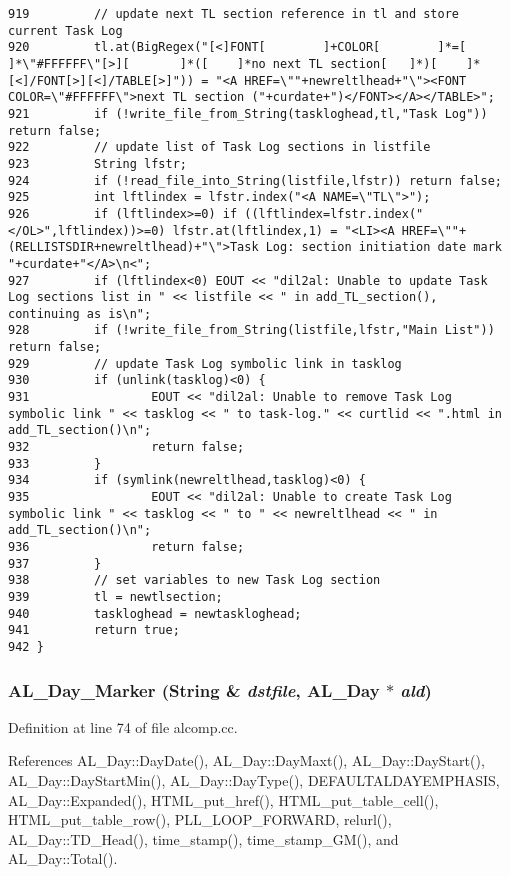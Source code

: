\begin{verbatim}
919         // update next TL section reference in tl and store current Task Log
920         tl.at(BigRegex("[<]FONT[        ]+COLOR[        ]*=[    ]*\"#FFFFFF\"[>][       ]*([    ]*no next TL section[   ]*)[    ]*[<]/FONT[>][<]/TABLE[>]")) = "<A HREF=\""+newreltlhead+"\"><FONT COLOR=\"#FFFFFF\">next TL section ("+curdate+")</FONT></A></TABLE>";
921         if (!write_file_from_String(taskloghead,tl,"Task Log")) return false;
922         // update list of Task Log sections in listfile
923         String lfstr;
924         if (!read_file_into_String(listfile,lfstr)) return false;
925         int lftlindex = lfstr.index("<A NAME=\"TL\">");
926         if (lftlindex>=0) if ((lftlindex=lfstr.index("</OL>",lftlindex))>=0) lfstr.at(lftlindex,1) = "<LI><A HREF=\""+(RELLISTSDIR+newreltlhead)+"\">Task Log: section initiation date mark "+curdate+"</A>\n<";
927         if (lftlindex<0) EOUT << "dil2al: Unable to update Task Log sections list in " << listfile << " in add_TL_section(), continuing as is\n";
928         if (!write_file_from_String(listfile,lfstr,"Main List")) return false;
929         // update Task Log symbolic link in tasklog
930         if (unlink(tasklog)<0) {
931                 EOUT << "dil2al: Unable to remove Task Log symbolic link " << tasklog << " to task-log." << curtlid << ".html in add_TL_section()\n";
932                 return false;
933         }
934         if (symlink(newreltlhead,tasklog)<0) {
935                 EOUT << "dil2al: Unable to create Task Log symbolic link " << tasklog << " to " << newreltlhead << " in add_TL_section()\n";
936                 return false;
937         }
938         // set variables to new Task Log section
939         tl = newtlsection;
940         taskloghead = newtaskloghead;
941         return true;
942 }
\end{verbatim}\normalsize 
{}
\subsubsection{ AL\_\-Day\_\-Marker ({\bf String} \& {\em dstfile}, {\bf AL\_\-Day} $\ast$ {\em ald})}\label{dil2al_8hh_a285}




Definition at line 74 of file alcomp.cc.

References AL\_\-Day::Day\-Date(), AL\_\-Day::Day\-Maxt(), AL\_\-Day::Day\-Start(), AL\_\-Day::Day\-Start\-Min(), AL\_\-Day::Day\-Type(), DEFAULTALDAYEMPHASIS, AL\_\-Day::Expanded(), HTML\_\-put\_\-href(), HTML\_\-put\_\-table\_\-cell(), HTML\_\-put\_\-table\_\-row(), PLL\_\-LOOP\_\-FORWARD, relurl(), AL\_\-Day::TD\_\-Head(), time\_\-stamp(), time\_\-stamp\_\-GM(), and AL\_\-Day::Total().

